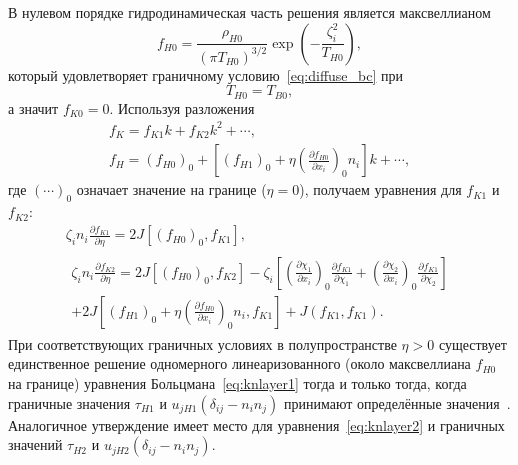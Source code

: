 \documentclass[
aps,%
12pt,%
final,%
notitlepage,%
oneside,%
onecolumn,%
nobibnotes,%
nofootinbib,%
superscriptaddress,%
noshowpacs,%
showkeys,%
floatfix,%
tightenlines,%
centertags]%
{revtex4}
\newcommand{\pder}[2][]{\frac{\partial#1}{\partial#2}}
\newcommand{\deltann}[2]{(\delta_{#1#2}-n_#1 n_#2)}
\newcommand{\onwall}[1]{\left(#1\right)_0}
\begin{document}
В нулевом порядке гидродинамическая часть решения является максвеллианом
\begin{equation}\label{eq:fH0_solution}
    f_{H0} = \frac{\rho_{H0}}{(\pi T_{H0})^{3/2}}\exp\left(-\frac{\zeta_i^2}{T_{H0}}\right),
\end{equation}
который удовлетворяет граничному условию~\eqref{eq:diffuse_bc} при
\begin{equation}\label{eq:boundary_T0}
    T_{H0} = T_{B0},
\end{equation}
а значит \(f_{K0} = 0\). Используя разложения
\begin{gather}
    f_K = f_{K1}k + f_{K2}k^2 + \cdots, \label{eq:knlayer_expansion}\\
    f_H = \onwall{f_{H0}} + \left[\onwall{f_{H1}} + \eta\onwall{\pder[f_{H0}]{x_i}}n_i \right]k + \cdots, \label{eq:Honwall_expansion}
\end{gather}
где \(\onwall{\cdots}\) означает значение на границе (\(\eta=0\)),
получаем уравнения для \(f_{K1}\) и \(f_{K2}\):
\begin{gather}
    \zeta_in_i\pder[f_{K1}]{\eta} = 2J\left[\onwall{f_{H0}},f_{K1}\right], \label{eq:knlayer1}\\
    \begin{multlined}
        \zeta_in_i\pder[f_{K2}]{\eta} = 2J\left[\onwall{f_{H0}}, f_{K2}\right]
        - \zeta_i\left[\onwall{\pder[\chi_1]{x_i}}\pder[f_{K1}]{\chi_1} + \onwall{\pder[\chi_2]{x_i}}\pder[f_{K1}]{\chi_2}\right] \\
        + 2J\left[\onwall{f_{H1}}+\eta\onwall{\pder[f_{H0}]{x_i}}n_i,f_{K1}\right] + J(f_{K1},f_{K1}).
    \end{multlined}\label{eq:knlayer2}
\end{gather}
При соответствующих граничных условиях в полупространстве \(\eta>0\) существует единственное решение
одномерного линеаризованного (около максвеллиана \(f_{H0}\) на границе) уравнения Больцмана~\eqref{eq:knlayer1}
тогда и только тогда, когда граничные значения \(\tau_{H1}\) и \(u_{jH1}\deltann{i}{j}\)
принимают определённые значения~\cite{Maslova1982, Bardos1986}.
Аналогичное утверждение имеет место для уравнения~\eqref{eq:knlayer2}
и граничных значений \(\tau_{H2}\) и \(u_{jH2}\deltann{i}{j}\).
\end{document}
